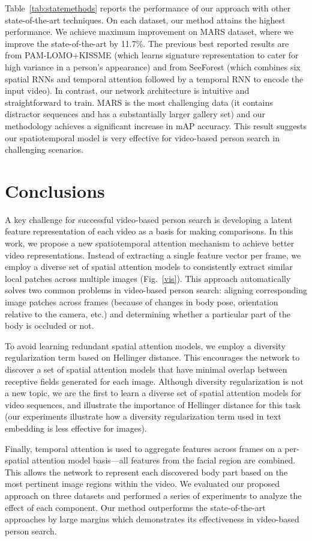 Table~\ref{tab:statemethods} reports the performance of our approach
with other state-of-the-art techniques. 
On each dataset, our method attains the highest performance. 
We achieve maximum improvement on MARS dataset, where we improve the state-of-the-art by 11.7\%.
The previous best reported results are from PAM-LOMO+KISSME \cite{khan2017multi} (which learns signature representation to cater for high variance in a person's appearance) and from SeeForest \cite{zhousee} (which combines six spatial RNNs and temporal attention followed by a temporal RNN to encode the input video). In contrast, our network architecture is intuitive and straightforward to train. 
MARS is the most challenging data (it contains distractor sequences and has a substantially larger gallery set) and our methodology achieves a significant increase in mAP accuracy.  This result suggests our spatiotemporal model is very effective for video-based person search in challenging scenarios.


\section{Conclusions}

A key challenge for successful video-based person search is developing a latent feature representation of each video as a basis for making comparisons.  In this work, we propose a new spatiotemporal attention mechanism to achieve better video representations.  Instead of extracting a single feature vector per frame, we employ a diverse set of spatial attention models to consistently extract similar local patches across multiple images (Fig.~\ref{vis}).  This approach automatically solves two common problems in video-based person search: aligning corresponding image patches across frames (because of changes in body pose, orientation relative to the camera, etc.) and determining whether a particular part of the body is occluded or not.  

To avoid learning redundant spatial attention models, we employ a diversity regularization term based on Hellinger distance.  This encourages the network to discover a set of spatial attention models that have minimal overlap between receptive fields generated for each image.  Although diversity regularization is not a new topic, we are the first to learn a diverse set of spatial attention models for video sequences, and illustrate the importance of Hellinger distance for this task (our experiments illustrate how a diversity regularization term used in text embedding is less effective for images).  

Finally, temporal attention is used to aggregate features across frames on a per-spatial attention model basis---\eg all features from the facial region are combined.  This allows the network to represent each discovered body part based on the most pertinent image regions within the video.  We evaluated our proposed approach on three datasets and performed a series of experiments to analyze the effect of each component. Our method outperforms the state-of-the-art approaches by large margins which demonstrates its effectiveness in video-based person search.
